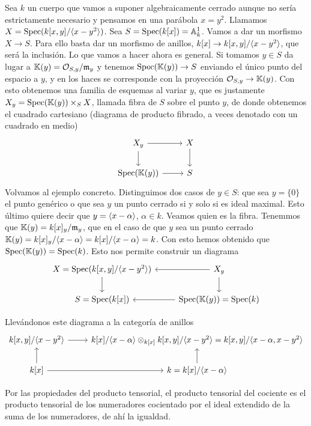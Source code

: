 \documentclass[GA.tex]{subfiles}
\begin{document}
\begin{ej}
Sea $k$ un cuerpo que vamos a suponer algebraicamente cerrado aunque no sería estrictamente necesario y pensamos en una parábola $x=y^2$. Llamamos $X=\operatorname{Spec}(k[x,y]/\langle{x-y^2}\rangle)$. Sea $S=\operatorname{Spec}(k[x])=\mathbb{A}_k^1$. Vamos a dar un morfismo $X\to S$. Para ello basta dar un morfismo de anillos, $k[x]\to k[x,y]/\langle{x-y^2}\rangle$, que será la inclusión. Lo que vamos a hacer ahora es general. Si tomamos $y\in S$ da lugar a $\mathbb{K}(y)={\mathcal O}_{S,y}/{\mathfrak{m}}_y$ y tenemos $\operatorname{Spec}(\mathbb{K}(y))\to S$ enviando el único punto del espacio a $y$, y en los haces se corresponde con la proyección ${\mathcal O}_{S,y}\to \mathbb{K}(y)$. Con esto obtenemos una familia de esquemas al variar $y$, que es justamente $X_y=\operatorname{Spec}(\mathbb{K}(y))\times_S X$, llamada fibra de $S$ sobre el punto $y$, de donde obtenemos el cuadrado cartesiano (diagrama de producto fibrado, a veces denotado con un cuadrado en medio)
\[
\begin{tikzcd}
X_y\arrow[r]\arrow[d] & X\arrow[d]\\
\spec(\K(y))\arrow[r] & S
\end{tikzcd}
\]
Volvamos al ejemplo concreto. Distinguimos dos casos de $y\in S$: que sea $y=\{0\}$ el punto genérico o que sea $y$ un punto cerrado si y solo si es ideal maximal. Esto último quiere decir que $y=\langle{x-\alpha}\rangle$, $\alpha\in k$. Veamos quien es la fibra. Tenemmos que $\mathbb{K}(y)=k[x]_y/{\mathfrak{m}}_y$, que en el caso de que $y$ sea un punto cerrado $\mathbb{K}(y)=k[x]_y/\langle{x-\alpha}\rangle=k[x]/\langle{x-\alpha}\rangle=k$. Con esto hemos obtenido que $\operatorname{Spec}(\mathbb{K}(y))=\operatorname{Spec}(k)$. Esto nos permite construir un diagrama
\[
\begin{tikzcd}
X=\spec(k[x,y]/\gene{x-y^2})\arrow[d] & X_y\arrow[d]\arrow[l]\\
S=\spec(k[x])& \spec(\K(y))=\spec(k)\arrow[l]
\end{tikzcd}
\]

Llevándonos este diagrama a la categoría de anillos 
\[
\begin{tikzcd}
k[x,y]/\gene{x-y^2}\arrow[r] & k[x]/\gene{x-\alpha}\otimes_{k[x]}k[x,y]/\gene{x-y^2}=k[x,y]/\gene{x-\alpha,x-y^2}\\
k[x]\arrow[u]\arrow[r] & k=k[x]/\gene{x-\alpha}\arrow[u]
\end{tikzcd}
\]

Por las propiedades del producto tensorial, el producto tensorial del cociente es el producto tensorial de los numeradores cocientado por el ideal extendido de la suma de los numeradores, de ahí la igualdad.


\end{ej}
\end{document}
